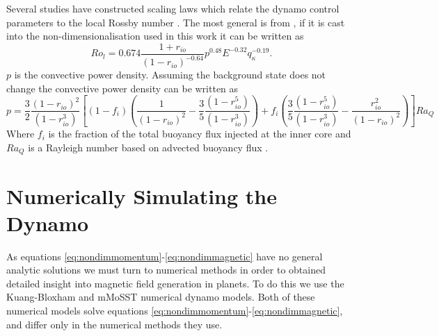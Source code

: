 Several studies have constructed scaling laws which relate the dynamo control parameters to the local Rossby number \citep{christensen06scaling,OlsonandChristensen2006,aubert2009}. The most general is from \citet{aubert2009}, if it is cast into the non-dimensionalisation used in this work it can be written as
\begin{equation}
Ro_{l}=0.674\frac{1+r_{io}}{\left(1-r_{io}\right)^{-0.64}}p^{0.48}E^{-0.32}q_{\kappa}^{-0.19}.
\label{eq:rolscaling}
\end{equation}
$p$ is the convective power density. Assuming the background state does not change the convective power density can be written as
\begin{equation}
p=\frac{3}{2}\frac{(1-r_{io})^2}{\left(1-r_{io}^3\right)} \left[(1-f_{i})\left(\frac{1}{(1-r_{io})^2}-\frac{3}{5}\frac{\left(1-r_{io}^5\right)}{\left(1-r_{io}^3\right)}\right)+f_{i} \left(\frac{3}{5}\frac{\left(1-r_{io}^5\right)}{\left(1-r_{io}^3\right)}-\frac{r_{io}^2}{(1-r_{io})^2}\right)\right]Ra_Q
\end{equation}
Where $f_i$ is the fraction of the total buoyancy flux injected at the inner core and $Ra_Q$ is a Rayleigh number based on advected buoyancy flux \citep{aubert2009}.

\section{Numerically Simulating the Dynamo}
As equations \ref{eq:nondimmomentum}-\ref{eq:nondimmagnetic} have no general analytic solutions we must turn to numerical methods in order to obtained detailed insight into magnetic field generation in planets. To do this we use the Kuang-Bloxham \citep{kuangandbloxham1997, kuangandbloxham1999} and mMoSST \citep{jiang2008} numerical dynamo models. Both of these numerical models solve equations \ref{eq:nondimmomentum}-\ref{eq:nondimmagnetic}, and differ only in the numerical methods they use. 

